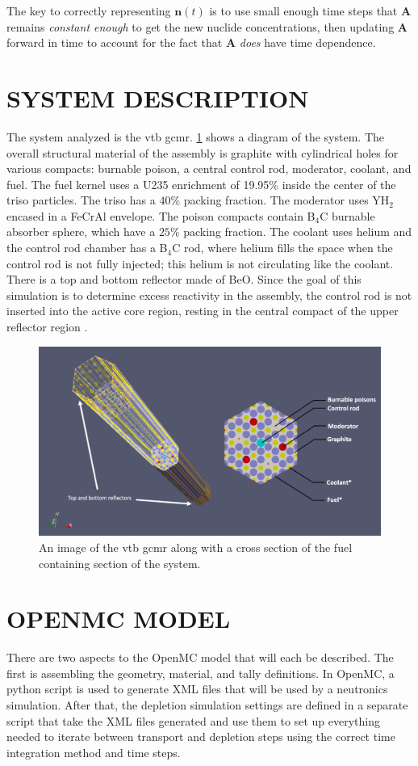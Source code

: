 \documentclass[letterpaper]{physor2024}
\begin{document}
The key to correctly representing $\textbf{n}(t)$ is to use small enough time steps that $\textbf{A}$ remains \textit{constant enough} to get the new nuclide concentrations, then updating $\textbf{A}$ forward in time to account for the fact that $\textbf{A}$ \textit{does} have time dependence.

\section{SYSTEM DESCRIPTION}\label{sec:system}
The system analyzed is the \gls{vtb} \gls{gcmr}. \cref{fig:vtb_gcmr} shows a diagram of the system. The overall structural material of the assembly is graphite with cylindrical holes for various compacts: burnable poison, a central control rod, moderator, coolant, and fuel. The fuel kernel uses a U235 enrichment of 19.95\% inside the center of the \gls{triso} particles. The \gls{triso} has a $40\%$ packing fraction. The moderator uses YH$_{2}$ encased in a FeCrAl envelope. The poison compacts contain B$_{4}$C burnable absorber sphere, which have a $25\%$ packing fraction. The coolant uses helium and the control rod chamber has a B$_{4}$C rod, where helium fills the space when the control rod is not fully injected; this helium is not circulating like the coolant. There is a top and bottom reflector made of BeO. Since the goal of this simulation is to determine excess reactivity in the assembly, the control rod is not inserted into the active core region, resting in the central compact of the upper reflector region \cite{Abdelhameed-ANS-2022}.
\begin{figure}[h!]
    \centering
    \includegraphics[width=0.725\linewidth]{figures/vtb_gcmr_diagram.jpg}
    \caption{An image of the \gls{vtb} \gls{gcmr} along with a cross section of the fuel containing section of the system.}
    \label{fig:vtb_gcmr}
\end{figure}

\section{OPENMC MODEL}\label{sec:openmc_model}
There are two aspects to the OpenMC model that will each be described. The first is assembling the geometry, material, and tally definitions. In OpenMC, a python script is used to generate XML files that will be used by a neutronics simulation. After that, the depletion simulation settings are defined in a separate script that take the XML files generated and use them to set up everything needed to iterate between transport and depletion steps using the correct time integration method and time steps.
\end{document}
